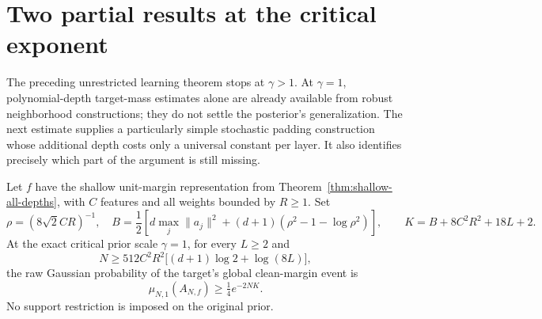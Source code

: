 \section{Two partial results at the critical exponent}
\label{sec:critical-padding-new}

The preceding unrestricted learning theorem stops at $\gamma>1$.
At $\gamma=1$, polynomial-depth target-mass estimates alone are already
available from robust neighborhood constructions; they do not settle the
posterior's generalization. The next estimate supplies a particularly
simple stochastic padding construction whose additional depth costs only
a universal constant per layer. It also identifies precisely which part
of the argument is still missing.

\begin{proposition}
\label{prop:critical-stochastic-padding}
Let $f$ have the shallow unit-margin representation from
Theorem~\ref{thm:shallow-all-depths}, with $C$ features and all weights
bounded by $R\ge1$. Set
\[
 \rho=(8\sqrt2 CR)^{-1},\quad
 B=\frac12\left[d\max_j\|a_j\|^2+
                (d+1)(\rho^2-1-\log\rho^2)\right],
 \qquad K=B+8C^2R^2+18L+2.
\]
At the exact critical prior scale $\gamma=1$, for every $L\ge2$ and
\[
 N\ge512C^2R^2\bigl[(d+1)\log2+\log(8L)\bigr],
\]
the raw Gaussian probability of the target's global clean-margin event is
\[
 \mu_{N,1}(A_{N,f})\ge\tfrac14e^{-2NK}.
\]
No support restriction is imposed on the original prior.
\end{proposition}

